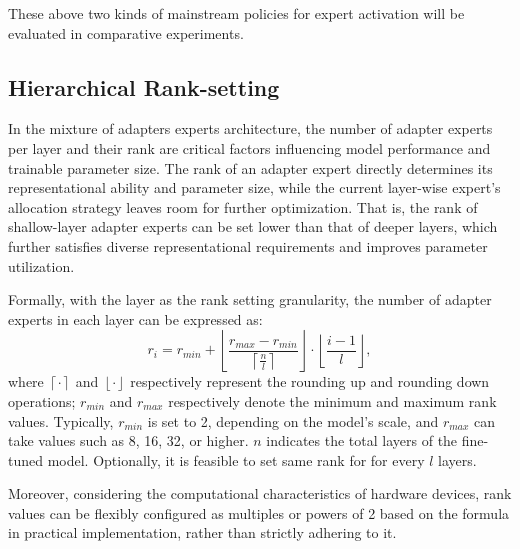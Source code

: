 These above two kinds of mainstream policies for expert activation will be evaluated in comparative experiments.

\subsection{Hierarchical Rank-setting}
In the mixture of adapters experts architecture, the number of adapter experts per layer and their rank are critical factors influencing model performance and trainable parameter size. The rank of an adapter expert directly determines its representational ability and parameter size, while the current layer-wise expert's allocation strategy leaves room for further optimization. That is, the rank of shallow-layer adapter experts can be set lower than that of deeper layers, which further satisfies diverse representational requirements and improves parameter utilization. 

Formally, with the layer as the rank setting granularity, the number of adapter experts in each layer can be expressed as: 
\[r_i = r_{min} + \left\lfloor \frac{r_{max} - r_{min}}{\left\lceil \frac{n}{l} \right\rceil} \right\rfloor \cdot \left\lfloor \frac{i-1}{l} \right\rfloor,\]
where \(\left\lceil \cdot \right\rceil\) and \(\left\lfloor \cdot \right\rfloor\) respectively represent the rounding up and rounding down operations; \(r_{min}\) and \(r_{max}\) respectively denote the minimum and maximum rank values. Typically, \(r_{min}\) is set to 2, depending on the model’s scale, and \(r_{max}\) can take values such as 8, 16, 32, or higher. \(n\) indicates the total layers of the fine-tuned model. Optionally, it is feasible to set same rank for for every \(l\) layers. 

Moreover, considering the computational characteristics of hardware devices, rank values can be flexibly configured as multiples or powers of 2 based on the formula in practical implementation, rather than strictly adhering to it.